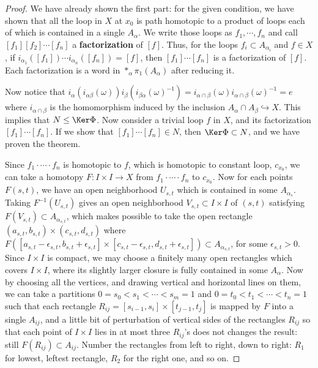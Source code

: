 \begin{proof}
We have already shown the first part: for the given condition, we have shown that all the loop in $X$ at $x_0$ is path homotopic to a product of loops each of which is contained in a single $A_\alpha$. We write those loops as $f_1,\cdots, f_n$ and call $[f_1][f_2]\cdots [f_n]$ a \textbf{factorization} of $[f]$. Thus, for the loops $f_i\subset A_{\alpha_i}$ and $f\in X$, if $i_{\alpha_1}([f_1])\cdots i_{\alpha_n}([f_n])=[f]$, then $[f_1]\cdots [f_n]$ is a factorization of $[f]$. Each factorization is a word in $*_\alpha \pi_1(A_\alpha)$ after reducing it.

Now notice that $i_{\alpha}(i_{\alpha\beta}(\omega))i_{\beta}(i_{\beta\alpha}(\omega)^{-1})=i_{\alpha\cap\beta}(\omega)i_{\alpha\cap\beta}(\omega)^{-1}=e$ where $i_{\alpha\cap\beta}$ is the homomorphism induced by the inclusion $A_\alpha\cap A_\beta\hookrightarrow X$. This implies that $N\leq \Ker \Phi$. Now consider a trivial loop $f$ in $X$, and its factorization $[f_1]\cdots[f_n]$. If we show that $[f_1]\cdots [f_n]\in N$, then $\Ker\Phi\subset N$, and we have proven the theorem.

Since $f_1\cdot \cdots \cdot f_n$ is homotopic to $f$, which is homotopic to constant loop, $c_{x_0}$, we can take a homotopy $F:I\times I\rightarrow X$ from $f_1\cdot \cdots \cdot f_n$ to $c_{x_0}$. Now for each points $F(s,t)$, we have an open neighborhood $U_{s,t}$ which is contained in some $A_{\alpha_s}$. Taking $F^{-1}(U_{s,t})$ gives an open neighborhood $V_{s,t}\subset I\times I$ of $(s,t)$ satisfying $F(V_{s,t})\subset A_{\alpha_{s,t}}$, which makes possible to take the open rectangle $(a_{s,t},b_{s,t})\times (c_{s,t},d_{s,t})$ where $F([a_{s,t}-\epsilon_{s,t},b_{s,t}+\epsilon_{s,t}]\times [c_{s,t}-\epsilon_{s,t},d_{s,t}+\epsilon_{s,t}])\subset A_{\alpha_{s,t}}$, for some $\epsilon_{s,t}>0$. Since $I\times I$ is compact, we may choose a finitely many open rectangles which covers $I\times I$, where its slightly larger closure is fully contained in some $A_\alpha$. Now by choosing all the vertices, and drawing vertical and horizontal lines on them, we can take a partitions $0=s_0<s_1<\cdots <s_m=1$ and $0=t_0<t_1<\cdots<t_n=1$ such that each rectangle $R_{ij}=[s_{i-1},s_{i}]\times [t_{j-1},t_j]$ is mapped by $F$ into a single $A_{ij}$, and a little bit of perturbation of vertical sides of the rectangles $R_{ij}$ so that each point of $I\times I$ lies in at most three $R_{ij}$'s does not changes the result: still $F(R_{ij})\subset A_{ij}$. Number the rectangles from left to right, down to right: $R_1$ for lowest, leftest rectangle, $R_2$ for the right one, and so on.


\end{proof}
